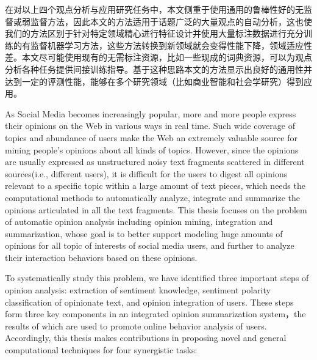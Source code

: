 \begin{cabstract}
在对以上四个观点分析与应用研究任务中，本文侧重于使用通用的鲁棒性好的无监督或弱监督方法，因此本文的方法适用于话题广泛的大量观点的自动分析，这也使我们的方法区别于针对特定领域精心进行特征设计并使用大量标注数据进行充分训练的有监督机器学习方法，这些方法转换到新领域就会变得性能下降，领域适应性差。本文尽可能使用现有的无需标注资源，比如一些现成的词典资源，可以为观点分析各种任务提供间接训练指导。基于这种思路本文的方法显示出良好的通用性并达到一定的评测性能，能够在多个研究领域（比如商业智能和社会学研究）得到应用。


\end{cabstract}

\begin{eabstract}

As Social Media becomes increasingly popular, more and more people express their opinions on the Web in various ways in real time. Such wide coverage of topics and abundance of users make the Web an extremely valuable source for mining people's opinions about all kinds of topics. However, since the opinions are usually expressed as unstructured noisy text fragments scattered in different sources(i.e., different users), it is difficult for the users to digest all opinions relevant to a specific topic within a large amount of text pieces, which needs the computational methods to automatically analyze, integrate and summarize the opinions articulated in all the text fragments. This thesis focuses on the problem of automatic opinion analysis including opinion mining, integration and summarization, whose goal is to better support modeling huge amounts of opinions for all topic of interests of social media users, and further to analyze their interaction behaviors based on these opinions. 

To systematically study this problem, we have identified three important steps of opinion analysis: extraction of sentiment knowledge, sentiment polarity classification of opinionate text, and opinion integration of users. These steps form three key components in an integrated opinion summarization system，the results of which are used to promote online behavior analysis of users. Accordingly, this thesis makes contributions in proposing novel and general computational techniques for four synergistic tasks: 


\end{eabstract}
